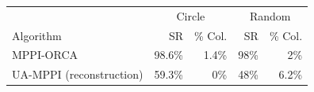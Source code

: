 \begin{tabular}{lrrrr}
\toprule
 & \multicolumn{2}{c}{Circle} & \multicolumn{2}{c}{Random} \\
Algorithm & SR & \% Col. & SR & \% Col. \\
\midrule
MPPI-ORCA & 98.6\% & 1.4\% & 98\% & 2\% \\
UA-MPPI (reconstruction) & 59.3\% & 0\% & 48\% & 6.2\% \\
\bottomrule
\end{tabular}
